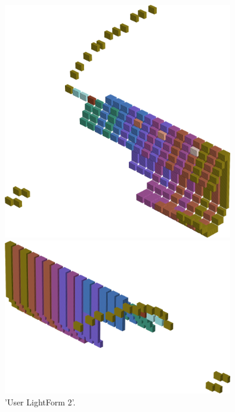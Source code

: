 \begin{minipage}[b]{0.48\linewidth}
\begin{figure}[H]
    \centering
    \begin{adjustbox}{width=5cm,margin=0cm 0cm}
      \includegraphics[width=10cm]{src/colorspace_patterns/pattern10-45.png}%
    \end{adjustbox}
    \begin{adjustbox}{width=5cm,margin=0cm 0cm}
      \includegraphics[width=10cm]{src/colorspace_patterns/pattern10-225.png}%
    \end{adjustbox}
\caption{'User LightForm 2'.}
\end{figure}
\end{minipage}
